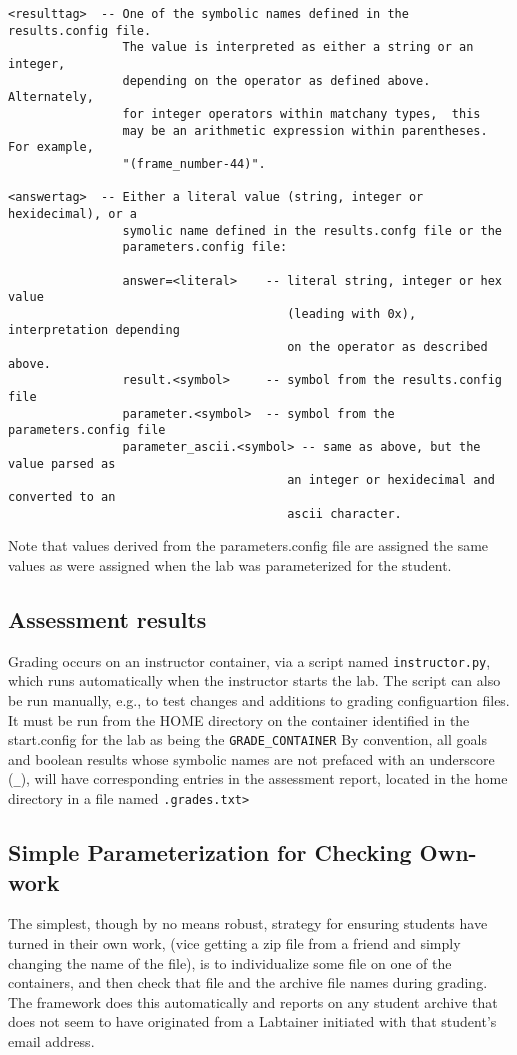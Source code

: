 \documentclass[12pt]{article}
\begin{document}
\begin{verbatim}
<resulttag>  -- One of the symbolic names defined in the results.config file.
                The value is interpreted as either a string or an integer,
                depending on the operator as defined above.  Alternately, 
                for integer operators within matchany types,  this
                may be an arithmetic expression within parentheses.  For example,
                "(frame_number-44)".
                
<answertag>  -- Either a literal value (string, integer or hexidecimal), or a 
                symolic name defined in the results.confg file or the 
                parameters.config file:
 
                answer=<literal>    -- literal string, integer or hex value 
                                       (leading with 0x), interpretation depending 
                                       on the operator as described above.
                result.<symbol>     -- symbol from the results.config file
                parameter.<symbol>  -- symbol from the parameters.config file
                parameter_ascii.<symbol> -- same as above, but the value parsed as 
                                       an integer or hexidecimal and converted to an 
                                       ascii character.

\end{verbatim}
         Note that values derived from the parameters.config file are assigned the same values as
         were assigned when the lab was parameterized for the student.

\subsection{Assessment results}
Grading occurs on an instructor container, via a script named {\tt instructor.py}, which runs
automatically when the instructor starts the lab.  The script can also be run manually, e.g., to
test changes and additions to grading configuartion files.  It must be run from the HOME directory
on the container identified in the start.config for the lab as being the {\tt GRADE\_CONTAINER}
By convention, all goals and boolean results whose symbolic names are not prefaced with an
underscore ({\tt\_}), will have corresponding entries in the assessment report, located in 
the home directory in a file named {\tt <lab name>.grades.txt>}

\subsection{Simple Parameterization for Checking Own-work}
The simplest, though by no means robust, strategy for ensuring students
have turned in their own work, (vice getting a zip file from a friend and simply
changing the name of the file), is to individualize some file on one of the containers,
and then check that file and the archive file names during grading.  The framework does
this automatically and reports on any student archive that does not seem to have
originated from a Labtainer initiated with that student's email address.
\end{document}
